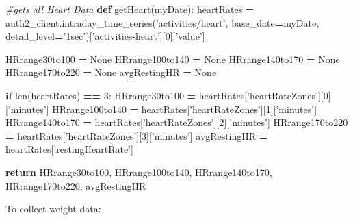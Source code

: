 \documentclass[]{book}
\newenvironment{Shaded}{\begin{snugshade}}{\end{snugshade}}
\newcommand{\KeywordTok}[1]{\textcolor[rgb]{0.13,0.29,0.53}{\textbf{#1}}}
\newcommand{\DecValTok}[1]{\textcolor[rgb]{0.00,0.00,0.81}{#1}}
\newcommand{\StringTok}[1]{\textcolor[rgb]{0.31,0.60,0.02}{#1}}
\newcommand{\CommentTok}[1]{\textcolor[rgb]{0.56,0.35,0.01}{\textit{#1}}}
\newcommand{\VariableTok}[1]{\textcolor[rgb]{0.00,0.00,0.00}{#1}}
\newcommand{\ControlFlowTok}[1]{\textcolor[rgb]{0.13,0.29,0.53}{\textbf{#1}}}
\newcommand{\OperatorTok}[1]{\textcolor[rgb]{0.81,0.36,0.00}{\textbf{#1}}}
\newcommand{\BuiltInTok}[1]{#1}
\newcommand{\NormalTok}[1]{#1}
\begin{document}
\begin{Shaded}
\begin{Highlighting}[]
\CommentTok{#gets all Heart Data}
\KeywordTok{def}\NormalTok{ getHeart(myDate): }
\NormalTok{        heartRates }\OperatorTok{=}\NormalTok{ auth2_client.intraday_time_series(}\StringTok{'activities/heart'}\NormalTok{, base_date}\OperatorTok{=}\NormalTok{myDate, detail_level}\OperatorTok{=}\StringTok{'1sec'}\NormalTok{)[}\StringTok{'activities-heart'}\NormalTok{][}\DecValTok{0}\NormalTok{][}\StringTok{'value'}\NormalTok{]}

\NormalTok{        HRrange30to100 }\OperatorTok{=} \VariableTok{None}
\NormalTok{        HRrange100to140 }\OperatorTok{=} \VariableTok{None}
\NormalTok{        HRrange140to170 }\OperatorTok{=} \VariableTok{None}
\NormalTok{        HRrange170to220 }\OperatorTok{=} \VariableTok{None}
\NormalTok{        avgRestingHR }\OperatorTok{=} \VariableTok{None}
        
        \ControlFlowTok{if} \BuiltInTok{len}\NormalTok{(heartRates) }\OperatorTok{==} \DecValTok{3}\NormalTok{:}
\NormalTok{            HRrange30to100 }\OperatorTok{=}\NormalTok{ heartRates[}\StringTok{'heartRateZones'}\NormalTok{][}\DecValTok{0}\NormalTok{][}\StringTok{'minutes'}\NormalTok{]}
\NormalTok{            HRrange100to140 }\OperatorTok{=}\NormalTok{ heartRates[}\StringTok{'heartRateZones'}\NormalTok{][}\DecValTok{1}\NormalTok{][}\StringTok{'minutes'}\NormalTok{]}
\NormalTok{            HRrange140to170 }\OperatorTok{=}\NormalTok{ heartRates[}\StringTok{'heartRateZones'}\NormalTok{][}\DecValTok{2}\NormalTok{][}\StringTok{'minutes'}\NormalTok{]}
\NormalTok{            HRrange170to220 }\OperatorTok{=}\NormalTok{ heartRates[}\StringTok{'heartRateZones'}\NormalTok{][}\DecValTok{3}\NormalTok{][}\StringTok{'minutes'}\NormalTok{]}
\NormalTok{            avgRestingHR }\OperatorTok{=}\NormalTok{ heartRates[}\StringTok{'restingHeartRate'}\NormalTok{]}
            
        \ControlFlowTok{return}\NormalTok{ HRrange30to100, HRrange100to140, HRrange140to170, HRrange170to220, avgRestingHR}
\end{Highlighting}
\end{Shaded}

To collect weight data:
\end{document}
